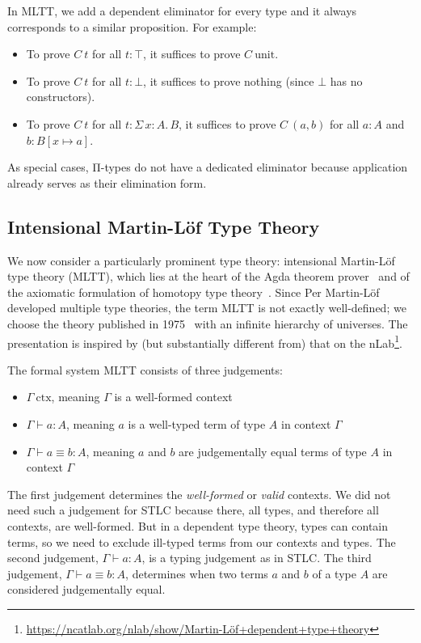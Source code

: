 \documentclass{scrartcl}
\theoremstyle{definition}
\newcommand{\SigT}[2]{Σ\,#1.\, #2}
\newcommand{\unit}{\mathrm{unit}}
\newcommand{\ctx}{\mathrm{ctx}}
\begin{document}
In MLTT, we add a dependent eliminator for every type and it always corresponds to a similar proposition.
For example:
\begin{itemize}
  \item To prove $C~t$ for all $t : ⊤$, it suffices to prove $C~\unit$.
  \item To prove $C~t$ for all $t : ⊥$, it suffices to prove nothing (since $⊥$ has no constructors).
  \item To prove $C~t$ for all $t : \SigT{x : A}{B}$, it suffices to prove $C~(a, b)$ for all $a : A$ and $b : B[x ↦ a]$.
\end{itemize}
As special cases, Π-types do not have a dedicated eliminator because application already serves as their elimination form.

\subsection{Intensional Martin-Löf Type Theory}

We now consider a particularly prominent type theory: intensional Martin-Löf type theory (MLTT), which lies at the heart of the Agda theorem prover~\cite{norell:thesis} and of the axiomatic formulation of homotopy type theory~\cite{hottbook}.
Since Per Martin-Löf developed multiple type theories, the term MLTT is not exactly well-defined; we choose the theory published in 1975~\cite{mltt75} with an infinite hierarchy of universes.
The presentation is inspired by (but substantially different from) that on the nLab\footnote{\url{https://ncatlab.org/nlab/show/Martin-Löf+dependent+type+theory}}.

The formal system MLTT consists of three judgements:
\begin{itemize}
  \item $Γ~\ctx$, meaning $Γ$ is a well-formed context
  \item $Γ ⊢ a : A$, meaning $a$ is a well-typed term of type $A$ in context $Γ$
  \item $Γ ⊢ a ≡ b : A$, meaning $a$ and $b$ are judgementally equal terms of type $A$ in context $Γ$
\end{itemize}

The first judgement determines the \emph{well-formed} or \emph{valid} contexts.
We did not need such a judgement for STLC because there, all types, and therefore all contexts, are well-formed.
But in a dependent type theory, types can contain terms, so we need to exclude ill-typed terms from our contexts and types.
The second judgement, $Γ ⊢ a : A$, is a typing judgement as in STLC.\@
The third judgement, $Γ ⊢ a ≡ b : A$, determines when two terms $a$ and $b$ of a type $A$ are considered judgementally equal.
\end{document}
